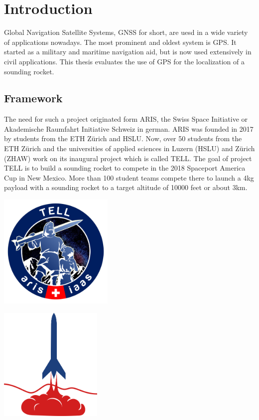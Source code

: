 \chapter{Introduction}

Global Navigation Satellite Systems, GNSS for short, are uesd in a wide variety of applications nowadays.
The most prominent and oldest system is GPS.
It started as a military and maritime navigation aid, but is now used extensively in civil applications.
This thesis evaluates the use of GPS for the localization of a sounding rocket.

\section{Framework}

The need for such a project originated form ARIS, the Swiss Space Initiative or Akademische Raumfahrt Initiative Schweiz in german.
ARIS was founded in 2017 by students from the ETH Z\"urich and HSLU.
Now, over 50 students from the ETH Z\"urich and the universities of applied sciences in Luzern (HSLU) and Z\"urich (ZHAW) work on its inaugural project which is called TELL.
The goal of project TELL is to build a sounding rocket to compete in the 2018 Spaceport America Cup in New Mexico.
More than 100 student teams compete there to launch a 4kg payload with a sounding rocket to a target altitude of 10000 feet or about 3km. \cite{aris}

\noindent
\begin{minipage}{0.5\textwidth}
 \centering
 \includegraphics[height=5.5cm]{images/Tell_Logo.png}
\end{minipage}
\begin{minipage}{0.5\textwidth}
 \centering
 \includegraphics[height=5.5cm]{images/SAC_Logo.png}
\end{minipage}


